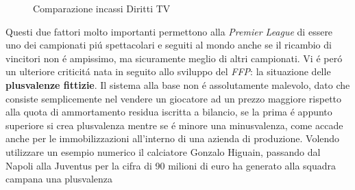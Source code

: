 \documentclass[
    corpo=12pt,
    oneside,
    evenboxes,
    tipotesi=triennale,
    stile=classica,
    oldstyle,
    autoretitolo,
    greek,
]{toptesi}
\begin{document}
\begin{interlinea}{1.5}
\begin{figure}
    \centering
     \quad
    \caption{Comparazione incassi Diritti TV}
    \label{comp_diritti_tv}  
\end{figure}
Questi due fattori molto importanti permettono alla \emph{Premier League} di essere uno dei campionati pi\'u spettacolari e seguiti al mondo anche se 
il ricambio di vincitori non \'e ampissimo, ma sicuramente meglio di altri campionati.\newline
Vi \'e per\'o un ulteriore criticit\'a nata in seguito allo sviluppo del \emph{FFP}: la situazione delle \textbf{plusvalenze fittizie}.
Il sistema alla base non \'e assolutamente malevolo, dato che consiste semplicemente nel vendere un giocatore ad un prezzo maggiore rispetto
alla quota di ammortamento residua iscritta a bilancio, se la prima \'e appunto superiore si crea plusvalenza mentre se \'e minore una 
minusvalenza, come accade anche per le immobilizzazioni all'interno di una azienda di produzione. Volendo utilizzare un esempio numerico il 
calciatore Gonzalo Higuain, passando dal Napoli alla Juventus per la cifra di 90 milioni di euro ha generato alla squadra campana una plusvalenza

\end{interlinea}
\end{document}
